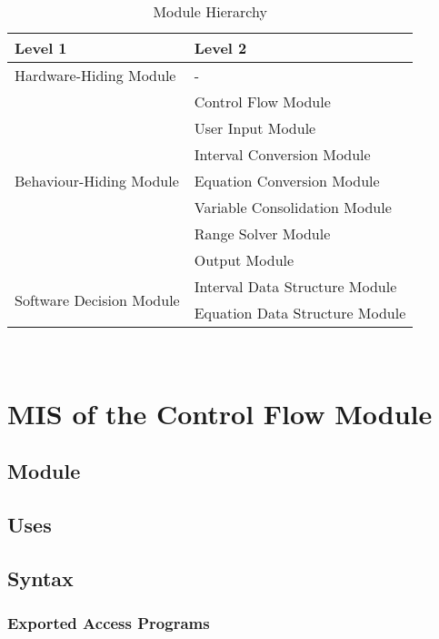 \documentclass[12pt, titlepage]{article}
\begin{document}
\begin{table}[h!]
	\centering
	\begin{tabular}{p{} p{}}
		\toprule
		\textbf{Level 1} & \textbf{Level 2}\\
		\midrule
		
		{Hardware-Hiding Module} & - \\
		\midrule
		
		\multirow{7}{0.29\textwidth}{Behaviour-Hiding Module} & Control Flow 
		Module \\
		& User Input Module \\
		& Interval Conversion Module \\
		& Equation Conversion Module \\
		& Variable Consolidation Module \\
		& Range Solver Module \\
		& Output Module \\
		\midrule
		
		\multirow{2}{0.29\textwidth}{Software Decision Module} & Interval Data 
		Structure Module \\
		& Equation Data Structure Module \\
		\bottomrule
		
	\end{tabular}
	\caption{Module Hierarchy}
	\label{TblMH}
\end{table}

\newpage
~\newpage

\section{MIS of the Control Flow Module} 
\label{Module_controlflow}

\subsection{Module}


\subsection{Uses}


\subsection{Syntax}

\subsubsection{Exported Access Programs}
\end{document}
